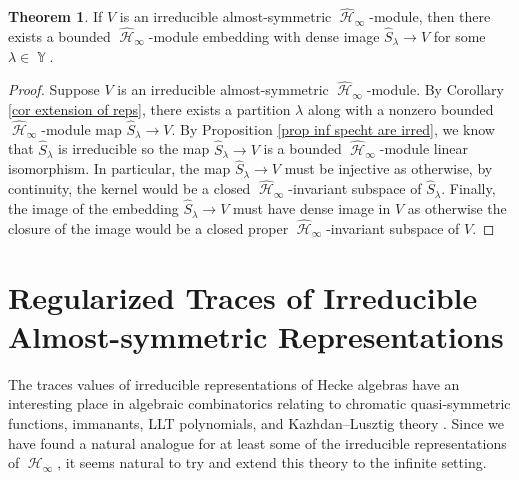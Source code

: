 \documentclass[12pt,reqno]{amsart}
\theoremstyle{definition}
\newtheorem{thm}{Theorem}[section]
\DeclareMathOperator{\cH}{\mathcal{H}}
\DeclareMathOperator{\Par}{\mathbb{Y}}
\begin{document}
\begin{thm}\label{thm classification of irreps}
    If $V$ is an irreducible almost-symmetric $\widehat{\cH}_{\infty}$-module, then there exists a bounded $\widehat{\cH}_{\infty}$-module embedding with dense image $ \hat{S}_{\lambda}\rightarrow  V$ for some $\lambda \in \Par.$
\end{thm}
\begin{proof}
    Suppose $V$ is an irreducible almost-symmetric $\widehat{\cH}_{\infty}$-module. By Corollary \ref{cor extension of reps}, there exists a partition $\lambda$ along with a nonzero bounded $\widehat{\cH}_{\infty}$-module map $\hat{S}_{\lambda} \rightarrow V$. By Proposition \ref{prop inf specht are irred}, we know that $\hat{S}_{\lambda}$ is irreducible so the map $\hat{S}_{\lambda} \rightarrow V$ is a bounded $\widehat{\cH}_{\infty}$-module linear isomorphism. In particular, the map $\hat{S}_{\lambda} \rightarrow V$ must be injective as otherwise, by continuity, the kernel would be a closed $\widehat{\cH}_{\infty}$-invariant subspace of $\hat{S}_{\lambda}.$ Finally, the image of the embedding $\hat{S}_{\lambda} \rightarrow V$ must have dense image in $V$ as otherwise the closure of the image would be a closed proper $\widehat{\cH}_{\infty}$-invariant subspace of $V$.
\end{proof}


\section{Regularized Traces of Irreducible Almost-symmetric Representations}

The traces values of irreducible representations of Hecke algebras have an interesting place in algebraic combinatorics relating to chromatic quasi-symmetric functions, immanants, LLT polynomials, and Kazhdan--Lusztig theory \cite{Haiman} \cite{SW16} \cite{MSW}. Since we have found a natural analogue for at least some of the irreducible representations of $\cH_{\infty}$, it seems natural to try and extend this theory to the infinite setting. 
\end{document}
